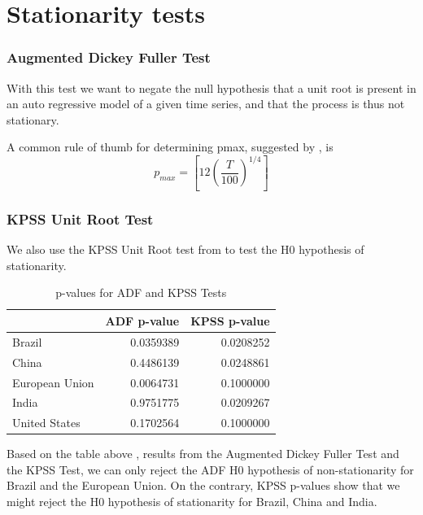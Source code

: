 \documentclass[
]{article}
\begin{document}
\newpage

\hypertarget{stationarity-tests}{%
\section{Stationarity tests}\label{stationarity-tests}}

\hypertarget{augmented-dickey-fuller-test}{%
\subsubsection{Augmented Dickey Fuller
Test}\label{augmented-dickey-fuller-test}}

With this test we want to negate the null hypothesis that a unit root is
present in an auto regressive model of a given time series, and that the
process is thus not stationary.

A common rule of thumb for determining pmax, suggested by
\citet{schwert1989business}, is \[ p_{max}=[12(\frac{T}{100})^{1/4}]\]

\hypertarget{kpss-unit-root-test}{%
\subsubsection{KPSS Unit Root Test}\label{kpss-unit-root-test}}

We also use the KPSS Unit Root test from \citet{kwiatkowski1992testing}
to test the H0 hypothesis of stationarity.

\begin{table}[H]

\caption{\label{tab:tabunit}p-values for ADF and KPSS Tests}
\centering
\begin{tabular}[t]{l|r|r}
\hline
  &  ADF p-value & KPSS p-value\\
\hline
Brazil & 0.0359389 & 0.0208252\\
\hline
China & 0.4486139 & 0.0248861\\
\hline
European Union & 0.0064731 & 0.1000000\\
\hline
India & 0.9751775 & 0.0209267\\
\hline
United States & 0.1702564 & 0.1000000\\
\hline
\end{tabular}
\end{table}

Based on the table above , results from the Augmented Dickey Fuller Test
and the KPSS Test, we can only reject the ADF H0 hypothesis of
non-stationarity for Brazil and the European Union. On the contrary,
KPSS p-values show that we might reject the H0 hypothesis of
stationarity for Brazil, China and India.
\end{document}
